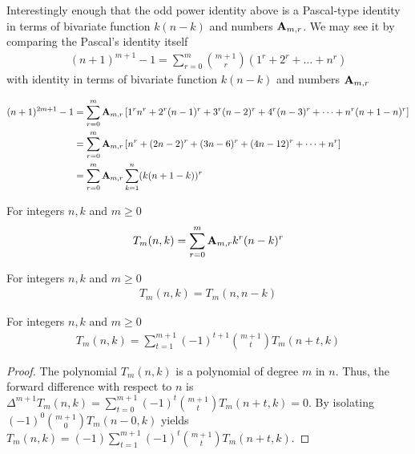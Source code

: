 Interestingly enough that the odd power identity above is a Pascal-type identity
in terms of bivariate function $k(n-k)$ and numbers ${\mathbf{A}} \sb{m,r}$.
We may see it by comparing the Pascal's identity itself~\cite{macmillan2011proofs}
\begin{align*}
(n+1)
    ^{m+1}-1 = \sum_{r=0}^{m} \binom{m+1}{r} \left( 1^{r}+2^{r} + \dots + n^{r} \right)
\end{align*}
with identity in terms of bivariate function $k(n-k)$ and numbers ${\mathbf{A}} \sb{m,r}$
\begin{corollary}
    \begin{align*}
    (n+1)
        ^{2m+1} - 1
        &= \sum_{r=0}^{m} {\mathbf{A}} \sb{m,r} \left[ 1^r n^r + 2^r (n-1)^r + 3^r (n-2)^r + 4^r (n-3)^r + \cdots + n^r (n+1-n)^r  \right] \\
        &= \sum_{r=0}^{m} {\mathbf{A}} \sb{m,r} \left[ n^r + (2n-2)^r + (3n-6)^r + (4n-12)^r + \cdots + n^r  \right] \\
        &= \sum_{r=0}^{m} {\mathbf{A}} \sb{m,r} \sum_{k=1}^{n} (k (n+1-k))^r
    \end{align*}
\end{corollary}
\begin{definition}
    For integers $n,k$ and $m \geq 0$
    \label{def:bivariate-sum-Tm}
    \begin{align*}
        T_{m}(n,k) = \sum_{r=0}^{m} {\mathbf{A}} \sb{m,r} k^r (n-k)^r
    \end{align*}
\end{definition}

\begin{proposition}[Symmetry of $T_m$]
    \label{prop:Tm-symmetry}
    For integers $n,k$ and $m\geq 0$
    \begin{align*}
        T_{m} (n, k) = T_{m} (n, n-k)
    \end{align*}
\end{proposition}
\begin{proposition}
    For integers $n,k$ and $m\geq 0$
    \label{prop:Tm-recurrence-forward}
    \begin{align*}
        T_{m} (n,k) = \sum_{t=1}^{m+1} (-1)^{t+1} \binom{m+1}{t} T_{m} (n+t, k)
    \end{align*}
    \begin{proof}
        The polynomial $T_{m} (n,k)$ is a polynomial of degree $m$ in $n$.
        Thus, the forward difference with respect to $n$ is
        $\Delta^{m+1} T_{m} (n, k) = \sum_{t=0}^{m+1} (-1)^{t} \binom{m+1}{t} T_{m} (n+t, k) = 0$.
        By isolating $(-1)^{0} \binom{m+1}{0} T_{m} (n-0, k)$ yields
        $T_{m} (n, k) = (-1) \sum_{t=1}^{m+1} (-1)^{t} \binom{m+1}{t} T_{m} (n+t, k)$.
    \end{proof}
\end{proposition}

